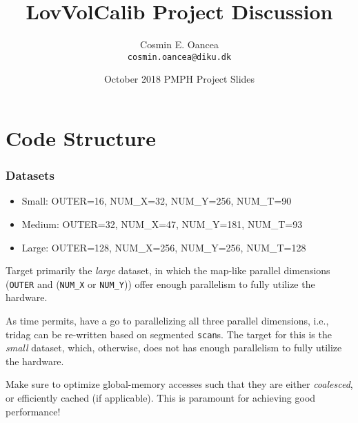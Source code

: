 \documentclass{beamer}
\title[LocVolCalib]{LovVolCalib Project Discussion}
\author[C.~Oancea]{Cosmin E. Oancea\\{\tt cosmin.oancea@diku.dk}}
\institute{Department of Computer Science (DIKU)\\University of Copenhagen}
\date[Oct 2018]{October 2018 PMPH Project Slides}
\begin{document}
\titleslide


\begin{frame}[fragile]
	\tableofcontents
\end{frame}


\section{Code Structure}

\begin{frame}[fragile,t]
  \frametitle{Datasets} %
\begin{itemize}
    \item{Small:} OUTER=16, NUM\_X=32, NUM\_Y=256, NUM\_T=90\medskip
    \item{Medium:} OUTER=32, NUM\_X=47, NUM\_Y=181, NUM\_T=93\medskip
    \item{Large:} OUTER=128, NUM\_X=256, NUM\_Y=256, NUM\_T=128
\end{itemize}\bigskip

\medskip 
Target primarily the {\em large} dataset, in which the map-like parallel 
dimensions ({\tt OUTER} and ({\tt NUM\_X} or {\tt NUM\_Y})) offer enough 
parallelism to fully utilize the hardware.

\medskip

As time permits, have a go to parallelizing all three parallel dimensions, 
i.e., {\sc tridag} can be re-written based on segmented {\tt scan}s.  
The target for this is the {\em small} dataset, which, otherwise, does not 
has enough parallelism to fully utilize the hardware.

\medskip

\alert{Make sure to optimize global-memory accesses such that they are either {\em coalesced},
or efficiently cached (if applicable). This is paramount for achieving good performance!}

\end{frame}
\end{document}
